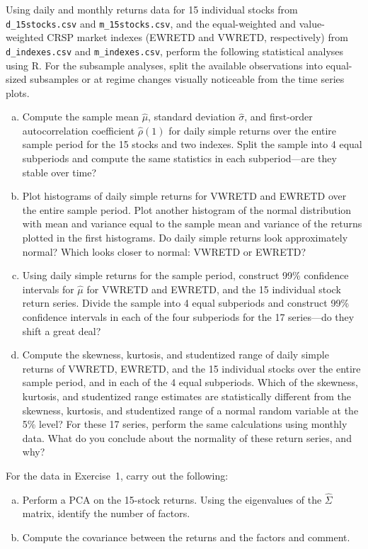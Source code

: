 Using daily and monthly returns data for 15 individual stocks from {\tt d\_15stocks.csv} and {\tt m\_15stocks.csv}, and the equal-weighted and value-weighted CRSP market indexes (EWRETD and VWRETD, respectively) from {\tt d\_indexes.csv} and {\tt m\_indexes.csv}, perform the following statistical analyses using R. For the subsample analyses, split the available observations into equal-sized subsamples or at regime changes visually noticeable from the time series plots.

\begin{enumerate}[(a)]
\item Compute the sample mean $\hat\mu$, standard deviation $\hat{\sigma}$, and first-order autocorrelation coefficient $\hat{\rho}(1)$ for daily simple returns over the entire sample period for the 15 stocks and two indexes. Split the sample into 4 equal subperiods and compute the same statistics in each subperiod---are they stable over time?
\item Plot histograms of daily simple returns for VWRETD and EWRETD over the entire sample period. Plot another histogram of the normal distribution with mean and variance equal to the sample mean and variance of the returns plotted in the first histograms. Do daily simple returns look approximately normal? Which looks closer to normal: VWRETD or EWRETD?
\item Using daily simple returns for the sample period, construct 99\% confidence intervals for $\hat{\mu}$ for VWRETD and EWRETD, and the 15 individual stock return series. Divide the sample into 4 equal subperiods and construct 99\% confidence intervals in each of the four subperiods for the 17 series---do they shift a great deal?
\item Compute the skewness, kurtosis, and studentized range of daily simple returns of VWRETD, EWRETD, and the 15 individual stocks over the entire sample period, and in each of the 4 equal subperiods. Which of the skewness, kurtosis, and studentized range estimates are statistically different from the skewness, kurtosis, and studentized range of a normal random variable at the 5\% level? For these 17 series, perform the same calculations using monthly data. What do you conclude about the normality of these return series, and why? \twomedskip
\end{enumerate}


\prob For the data in Exercise~1, carry out the following:

\begin{enumerate}[(a)]
\item Perform a PCA on the 15-stock returns. Using the eigenvalues of the $\hat{\Sigma}$ matrix, identify the number of factors.
\item Compute the covariance between the returns and the factors and comment. \twomedskip
\end{enumerate}


